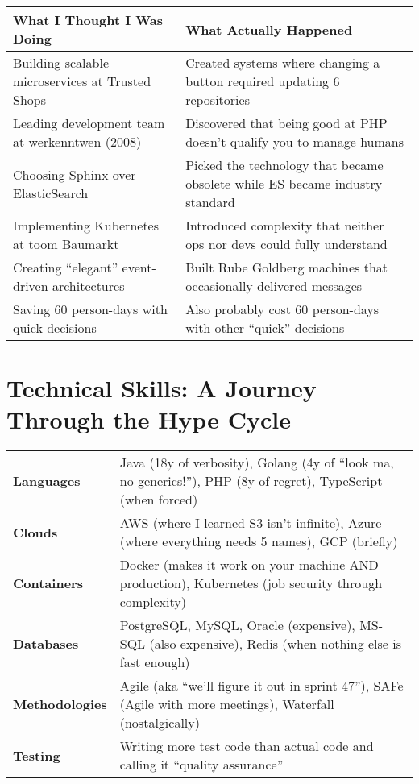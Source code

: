 \documentclass[10pt,a4paper]{article}
\begin{document}
\begin{tabularx}{\textwidth}{X|X}
\textbf{What I Thought I Was Doing} & \textbf{What Actually Happened} \\
\hline
Building scalable microservices at Trusted Shops & Created systems where changing a button required updating 6 repositories \\
Leading development team at werkenntwen (2008) & Discovered that being good at PHP doesn't qualify you to manage humans \\
Choosing Sphinx over ElasticSearch & Picked the technology that became obsolete while ES became industry standard \\
Implementing Kubernetes at toom Baumarkt & Introduced complexity that neither ops nor devs could fully understand \\
Creating ``elegant'' event-driven architectures & Built Rube Goldberg machines that occasionally delivered messages \\
Saving 60 person-days with quick decisions & Also probably cost 60 person-days with other ``quick'' decisions \\
\end{tabularx}

\section*{Technical Skills: A Journey Through the Hype Cycle}

\begin{tabularx}{\textwidth}{l|X}
\textbf{Languages} & Java (18y of verbosity), Golang (4y of ``look ma, no generics!''), PHP (8y of regret), TypeScript (when forced) \\
\textbf{Clouds} & AWS (where I learned S3 isn't infinite), Azure (where everything needs 5 names), GCP (briefly) \\
\textbf{Containers} & Docker (makes it work on your machine AND production), Kubernetes (job security through complexity) \\
\textbf{Databases} & PostgreSQL, MySQL, Oracle (expensive), MS-SQL (also expensive), Redis (when nothing else is fast enough) \\
\textbf{Methodologies} & Agile (aka ``we'll figure it out in sprint 47''), SAFe (Agile with more meetings), Waterfall (nostalgically) \\
\textbf{Testing} & Writing more test code than actual code and calling it ``quality assurance'' \\
\end{tabularx}
\end{document}

